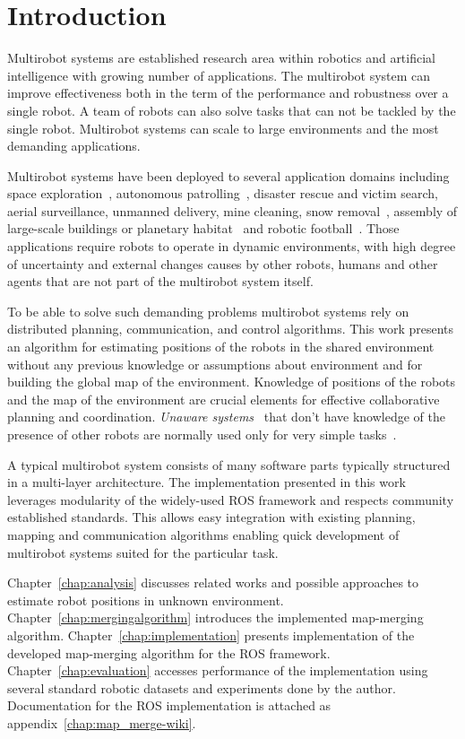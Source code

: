 \chapter*{Introduction}

Multirobot systems are established research area within robotics and artificial intelligence with growing number of applications. The multirobot system can improve effectiveness both in the term of the performance and robustness over a single robot. A team of robots can also solve tasks that can not be tackled by the single robot. Multirobot systems can scale to large environments and the most demanding applications.

Multirobot systems have been deployed to several application domains including space exploration~\citep{goldberg2002distributedspace,huntsberger2003campout}, autonomous patrolling~\citep{parker2003parolling100}, disaster rescue and victim search, aerial surveillance, unmanned delivery, mine cleaning, snow removal~\citep{choset2001coverage}, assembly of large-scale buildings or planetary habitat~\citep{goldberg2002distributedspace} and robotic football~\citep{asada1999robocup}. Those applications require robots to operate in  dynamic environments, with high degree of uncertainty and external changes causes by other robots, humans and other agents that are not part of the multirobot system itself.

To be able to solve such demanding problems multirobot systems rely on distributed planning, communication, and control algorithms. This work presents an algorithm for estimating positions of the robots in the shared environment without any previous knowledge or assumptions about environment and for building the global map of the environment. Knowledge of positions of the robots and the map of the environment are crucial elements for effective collaborative planning and coordination. \textit{Unaware systems}~\citet{farinelli2004multirobot} that don't have knowledge of the presence of other robots are normally used only for very
simple tasks~\citet{farinelli2004multirobot}.

A typical multirobot system consists of many software parts typically structured in a multi-layer architecture. The implementation presented in this work leverages modularity of the widely-used \gls{ROS} framework and respects community established standards. This allows easy integration with existing planning, mapping and communication algorithms enabling quick development of multirobot systems suited for the particular task.

Chapter~\ref{chap:analysis} discusses related works and possible approaches to estimate robot positions in unknown environment. Chapter~\ref{chap:mergingalgorithm} introduces the implemented map-merging algorithm. Chapter~\ref{chap:implementation} presents implementation of the developed map-merging algorithm for the \gls{ROS} framework. Chapter~\ref{chap:evaluation} accesses performance of the implementation using several standard robotic datasets and experiments done by the author. Documentation for the \gls{ROS} implementation is attached as appendix~\ref{chap:map_merge-wiki}.
